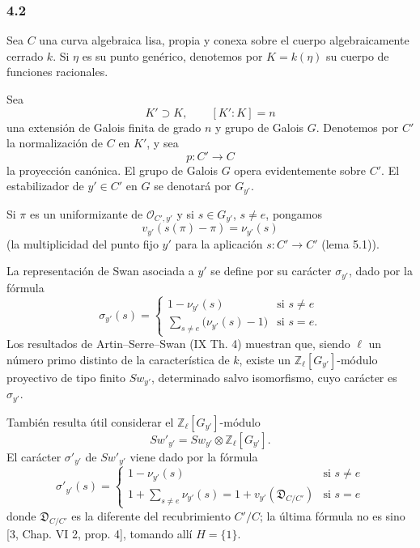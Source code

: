 \subsubsection*{4.2}

Sea $C$ una curva algebraica lisa, propia y conexa sobre el cuerpo algebraicamente cerrado $k$. Si $\eta$ es su punto genérico, denotemos por $K=k(\eta)$ su cuerpo de funciones racionales.

Sea
\[
K'\supset K,\qquad [K':K]=n
\]
una extensión de Galois finita de grado $n$ y grupo de Galois $G$. Denotemos por $C'$ la normalización de $C$ en $K'$, y sea
\[
p:C'\longrightarrow C
\]
la proyección canónica. El grupo de Galois $G$ opera evidentemente sobre $C'$. El estabilizador de $y'\in C'$ en $G$ se denotará por $G_{y'}$.

Si $\pi$ es un uniformizante de $\mathcal O_{C',y'}$ y si $s\in G_{y'}$, $s\ne e$, pongamos
\[
v_{y'}(s(\pi)-\pi)=\nu_{y'}(s)
\tag{4.2.1}
\]
(la multiplicidad del punto fijo $y'$ para la aplicación $s:C'\to C'$ (lema 5.1)).%

La representación de Swan asociada a $y'$ se define por su carácter $\sigma_{y'}$, dado por la fórmula
\[
\sigma_{y'}(s)=
\begin{cases}
1-\nu_{y'}(s)& \text{si } s\ne e\\[0.4em]
\displaystyle\sum_{s\ne e}\bigl(\nu_{y'}(s)-1\bigr)& \text{si } s=e.
\end{cases}
\tag{4.2.2}
\]
Los resultados de Artin--Serre--Swan (IX Th. 4) muestran que, siendo $\ell$ un número primo distinto de la característica de $k$, existe un $\mathbb Z_\ell[G_{y'}]$-módulo proyectivo de tipo finito $Sw_{y'}$, determinado salvo isomorfismo, cuyo carácter es $\sigma_{y'}$.

También resulta útil considerar el $\mathbb Z_\ell[G_{y'}]$-módulo
\[
Sw'_{y'}=Sw_{y'}\otimes\mathbb Z_\ell[G_{y'}].
\tag{4.2.3}
\]
El carácter $\sigma'_{y'}$ de $Sw'_{y'}$ viene dado por la fórmula
\[
\sigma'_{y'}(s)=
\begin{cases}
1-\nu_{y'}(s)& \text{si } s\ne e\\[0.4em]
\displaystyle 1+\sum_{s\ne e}\nu_{y'}(s)
=1+v_{y'}(\mathfrak D_{C/C'})& \text{si } s=e
\end{cases}
\tag{4.2.4}
\]
donde $\mathfrak D_{C/C'}$ es la diferente del recubrimiento $C'/C$; la última fórmula no es sino [3, Chap. VI 2, prop. 4], tomando allí $H=\{1\}$.

